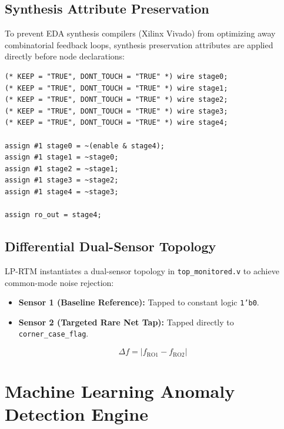 \documentclass[11pt,a4paper,oneside]{book}
\begin{document}
\section{Synthesis Attribute Preservation}

To prevent EDA synthesis compilers (Xilinx Vivado) from optimizing away combinatorial feedback loops, synthesis preservation attributes are applied directly before node declarations:

\begin{lstlisting}[language=VerilogCustom, caption={Verilog Implementation of RO Sensor with Synthesis Preservation Attributes (\texttt{ring\_oscillator.v})}]
(* KEEP = "TRUE", DONT_TOUCH = "TRUE" *) wire stage0;
(* KEEP = "TRUE", DONT_TOUCH = "TRUE" *) wire stage1;
(* KEEP = "TRUE", DONT_TOUCH = "TRUE" *) wire stage2;
(* KEEP = "TRUE", DONT_TOUCH = "TRUE" *) wire stage3;
(* KEEP = "TRUE", DONT_TOUCH = "TRUE" *) wire stage4;

assign #1 stage0 = ~(enable & stage4);
assign #1 stage1 = ~stage0;
assign #1 stage2 = ~stage1;
assign #1 stage3 = ~stage2;
assign #1 stage4 = ~stage3;

assign ro_out = stage4;
\end{lstlisting}

\section{Differential Dual-Sensor Topology}

LP-RTM instantiates a dual-sensor topology in \texttt{top\_monitored.v} to achieve common-mode noise rejection:
\begin{itemize}[leftmargin=1.5em]
  \item \textbf{Sensor 1 (Baseline Reference):} Tapped to constant logic \texttt{1'b0}.
  \item \textbf{Sensor 2 (Targeted Rare Net Tap):} Tapped directly to \texttt{corner\_case\_flag}.
\end{itemize}

\begin{equation}
\Delta f = |f_{\text{RO1}} - f_{\text{RO2}}|
\end{equation}

\chapter{Machine Learning Anomaly Detection Engine}
\end{document}
